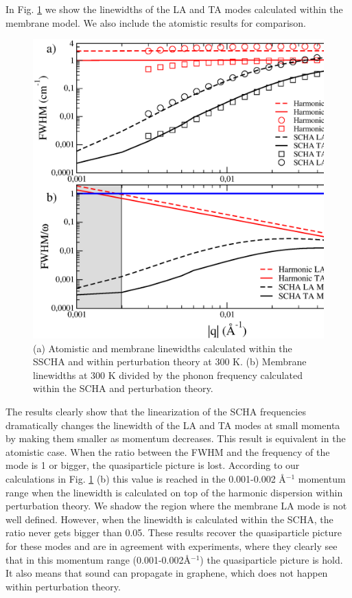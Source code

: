 In Fig. \ref{lw-membrane} we show the linewidths of the LA and TA modes calculated within the membrane model. We 
also include the atomistic results for comparison.
\begin{figure}[ht]
\includegraphics[width=0.8\linewidth]{Figures/lwmembrane.eps}
	\caption[Atomistic and membrane linewidths calculated within the SSCHA and within perturbation theory in 
	graphene]{(a) Atomistic and membrane linewidths calculated within the SSCHA and within perturbation theory 
	at 300 K. (b) Membrane linewidths at 300 K divided by the phonon frequency calculated within the SCHA and 
	perturbation theory.}
\label{lw-membrane}
\end{figure}
The results clearly show that the linearization of the SCHA frequencies dramatically changes the linewidth of the LA 
and TA modes at small momenta by making them smaller as momentum decreases. This result is equivalent in the 
atomistic case. When the ratio between the FWHM and the frequency of the mode is 1 or bigger, the quasiparticle 
picture is lost. According to our calculations in Fig. \ref{lw-membrane} (b) this value is reached in the 0.001-0.002 
\AA$^{-1}$ momentum range when the linewidth is calculated on top of the harmonic dispersion within perturbation 
theory. We shadow the region where the membrane LA mode is not well defined. However, when the linewidth is 
calculated within the SCHA, the ratio never gets bigger than 0.05. These results recover the quasiparticle picture 
for these modes and are in agreement with experiments\cite{wang2008brillouin}, where they clearly see that in this 
momentum range (0.001-0.002\AA$^{-1}$) the quasiparticle picture is hold. It also means that sound can propagate in 
graphene, which does not happen within perturbation theory. \\

